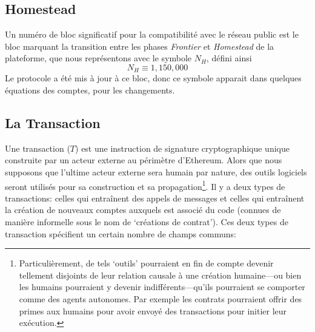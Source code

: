 \documentclass[9pt,oneside]{amsart}
\newcommand{\firsthomesteadblock}{\ensuremath{N_H}}
\begin{document}
\begin{multicols}{2}
\subsection{Homestead} \label{ch:homestead}

Un numéro de bloc significatif pour la compatibilité avec le réseau public est le bloc marquant la transition entre les phases {\it Frontier} et {\it Homestead} de la plateforme, que nous représentons avec le symbole \firsthomesteadblock, défini ainsi 
\begin{equation}
\firsthomesteadblock \equiv 1,\! 150,\! 000
\end{equation}
Le protocole a été mis à jour à ce bloc, donc ce symbole apparait dans quelques équations des comptes, pour les changements.

\subsection{La Transaction} \label{ch:transaction}

Une transaction ($T$) est une instruction de signature cryptographique unique construite par un acteur externe au périmètre d'Ethereum. Alors que nous supposons que l'ultime acteur externe sera humain par nature, des outils logiciels seront utilisés pour sa construction et sa propagation\footnote{Particulièrement, de tels `outils' pourraient en fin de compte devenir tellement disjoints de leur relation causale à une création humaine---ou bien les humains pourraient y devenir indifférents---qu'ils pourraient se comporter comme des agents autonomes. Par exemple les contrats pourraient offrir des primes aux humains pour avoir envoyé des transactions pour initier leur exécution.}. Il y a deux types de transactions: celles qui entraînent des appels de messages et celles qui entraînent la création de nouveaux comptes auxquels est associé du code (connues de manière informelle sous le nom de `créations de contrat'). Ces deux types de transaction spécifient un certain nombre de champs communs:


\end{multicols}
\end{document}
